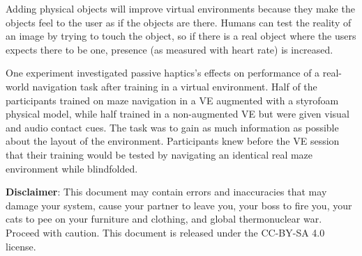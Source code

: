 \documentclass[answers, a4paper, 11pt]{exam}
\begin{document}
\begin{questions}
\begin{parts}
\begin{solution}
			Adding physical objects will improve virtual environments because they make the objects feel to the user as if the objects are there. Humans can test the reality of an image by trying to touch the object, so if there is a real object where the users expects there to be one, presence (as measured with heart rate) is increased.

			One experiment investigated passive haptics's effects on performance of a real-world navigation task after training in a virtual environment.
 Half of the participants trained on maze navigation in a VE augmented with a styrofoam physical model, while half trained in a non-augmented VE but were given visual and audio contact cues.
 The task was to gain as much information as possible about the layout of the environment.
 Participants knew before the VE session that their training would be tested by navigating an identical real maze environment while blindfolded.

		\end{solution}
	\end{parts}

\end{questions}

\textbf{Disclaimer}:  This document may contain errors and inaccuracies that may damage your system, cause your partner to leave you, your boss to fire you, your cats to pee on your furniture and clothing, and global thermonuclear war. Proceed with caution. This document is released under the CC-BY-SA 4.0 license. \ccbysa
\end{document}
